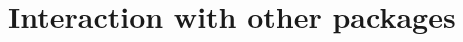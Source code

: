 \documentclass[draftspec]{sbmlpkgspec}
\newcommand{\controversial}{\marginpar{\hspace*{34pt}\raisebox{-0.5ex}{\Large?}}}
\begin{document}



\section{Interaction with other packages}
\end{document}
